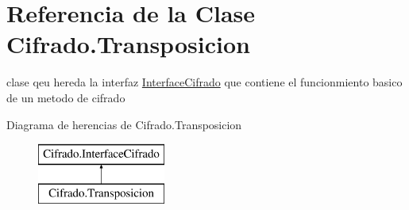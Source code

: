 \hypertarget{class_cifrado_1_1_transposicion}{}\section{Referencia de la Clase Cifrado.\+Transposicion}
\label{class_cifrado_1_1_transposicion}


clase qeu hereda la interfaz \hyperlink{interface_cifrado_1_1_interface_cifrado}{Interface\+Cifrado} que contiene el funcionmiento basico de un metodo de cifrado  


Diagrama de herencias de Cifrado.\+Transposicion\begin{figure}[H]
\begin{center}
\leavevmode
\includegraphics[height=2.000000cm]{class_cifrado_1_1_transposicion}
\end{center}
\end{figure}
